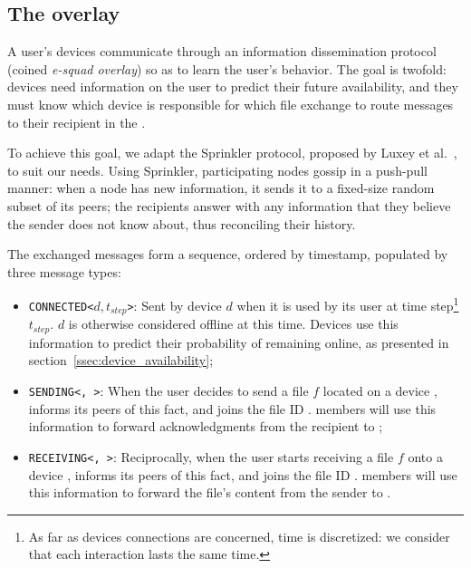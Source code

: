 

\subsection{The \squad overlay}
\label{sec:squad_overlay}

A user's devices communicate through an information dissemination protocol (coined \emph{e-squad overlay}) so as to learn the user's behavior.
The goal is twofold: 
devices need information on the user to predict their future availability, 
and they must know which device is responsible for which file exchange to route messages to their recipient in the \squad.

To achieve this goal, we adapt the Sprinkler protocol, proposed by Luxey et al.~\cite{luxey:hal-01704172}, to suit our needs. 
Using Sprinkler, participating nodes gossip in a push-pull manner: 
when a node has new information, it sends it to a fixed-size random subset of its peers; 
the recipients answer with any information that they believe the sender does not know about, thus reconciling their history.

The exchanged messages form a sequence, ordered by timestamp, populated by three message types:
\begin{itemize}
	\item \texttt{CONNECTED<$d, t_{step}$>}: Sent by device $d$ when it is used by its user at time step\footnote{As far as devices connections are concerned, time is discretized: we consider that each interaction lasts the same time.} $t_{step}$. $d$ is otherwise considered offline at this time. Devices use this information to predict their probability of remaining online, as presented in section~\ref{ssec:device_availability};
	\item \texttt{SENDING<\sendingdevice, \fileid>}: When the user decides to send a file $f$ located on a device \sendingdevice, \sendingdevice informs its peers of this fact, and joins the file ID \fileid. \Squad members will use this information to forward acknowledgments from the recipient to \sendingdevice;
	\item \texttt{RECEIVING<\recdevice, \fileid>}: Reciprocally, when the user starts receiving a file $f$ onto a device \recdevice, \recdevice informs its peers of this fact, and joins the file ID \fileid. \Squad members will use this information to forward the file's content from the sender to \recdevice.
\end{itemize}

